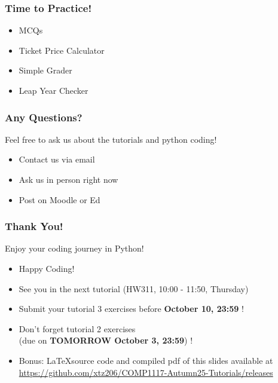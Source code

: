 \documentclass{beamer}
\begin{document}
\begin{frame}
    \frametitle{Time to Practice!}
    \begin{itemize}
        \item MCQs
        \item Ticket Price Calculator
        \item Simple Grader
        \item Leap Year Checker
    \end{itemize}
\end{frame}

\begin{frame}
    \frametitle{Any Questions?}

    Feel free to ask us about the tutorials and python coding!

    \begin{itemize}
        \item Contact us via email
        \item Ask us in person right now
        \item Post on Moodle or Ed
    \end{itemize}
\end{frame}

\begin{frame}
    \frametitle{Thank You!}

    Enjoy your coding journey in Python!

    \begin{itemize}
        \item Happy Coding!
        \item See you in the next tutorial (HW311, 10:00 - 11:50, Thursday)
        \item Submit your tutorial 3 exercises before \textbf{October 10, 23:59} !
        \item Don't forget tutorial 2 exercises\\
              (due on \textbf{TOMORROW October 3, 23:59}) !
        \item Bonus: \LaTeX source code and compiled pdf of this slides available at
              \href{https://github.com/xtz206/COMP1117-Autumn25-Tutorials/releases}{https://github.com/xtz206/COMP1117-Autumn25-Tutorials/releases}
    \end{itemize}
\end{frame}
\end{document}
